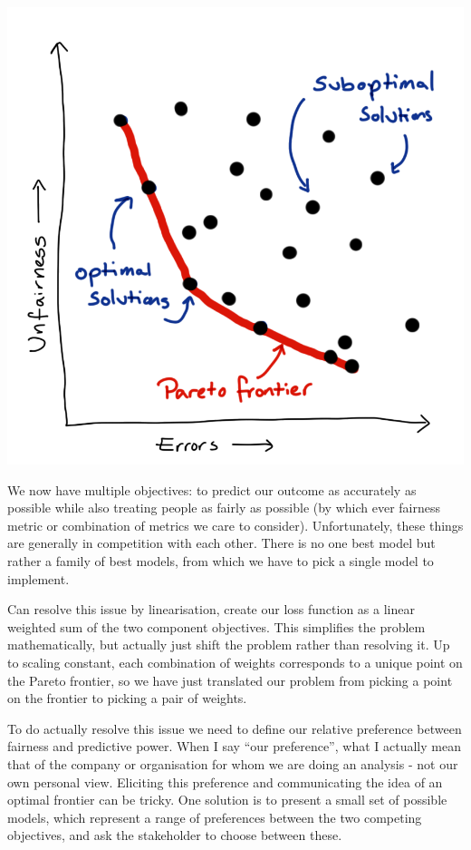 \documentclass[
  12pt,
]{book}
\begin{document}
\includegraphics{images/502-ethics-fairness/fairness-error-pareto-front.png}

We now have multiple objectives: to predict our outcome as accurately as possible while also treating people as fairly as possible (by which ever fairness metric or combination of metrics we care to consider). Unfortunately, these things are generally in competition with each other. There is no one best model but rather a family of best models, from which we have to pick a single model to implement.

Can resolve this issue by linearisation, create our loss function as a linear weighted sum of the two component objectives. This simplifies the problem mathematically, but actually just shift the problem rather than resolving it. Up to scaling constant, each combination of weights corresponds to a unique point on the Pareto frontier, so we have just translated our problem from picking a point on the frontier to picking a pair of weights.

To do actually resolve this issue we need to define our relative preference between fairness and predictive power. When I say ``our preference'', what I actually mean that of the company or organisation for whom we are doing an analysis - not our own personal view. Eliciting this preference and communicating the idea of an optimal frontier can be tricky. One solution is to present a small set of possible models, which represent a range of preferences between the two competing objectives, and ask the stakeholder to choose between these.
\end{document}
